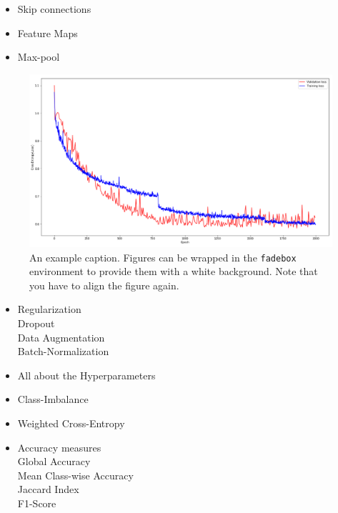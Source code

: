 \documentclass[
]{dtuposter}
\begin{document}
\begin{dtupostercontent}
\begin{itemize}
	\item Skip connections
	\item Feature Maps
	\item Max-pool
\end{itemize}


\begin{figure}
	\begin{fadebox}\begin{center}
			\includegraphics[width=\linewidth,origin=c]{loss}
	\end{center}\end{fadebox}
	\caption{An example caption. Figures can be wrapped in the \texttt{fadebox} 
		environment to provide them with a white background. Note that you have to align the 
		figure again.}\label{fig:example2}
\end{figure}


\begin{itemize}
	\item Regularization \\
		Dropout \\
		Data Augmentation \\
		Batch-Normalization
	
	\item All about the Hyperparameters
\end{itemize}

\begin{itemize}
	\item Class-Imbalance
	\item Weighted Cross-Entropy
	
	\item Accuracy measures \\
		Global Accuracy \\
		Mean Class-wise Accuracy \\
		Jaccard Index \\
		F1-Score
\end{itemize}


\end{dtupostercontent}
\end{document}
